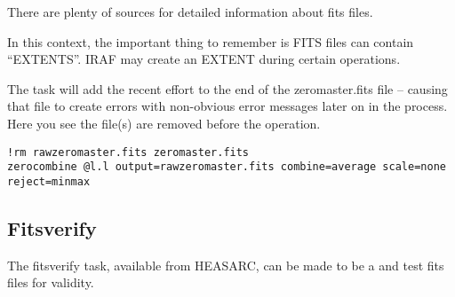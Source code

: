 There are plenty of sources for detailed information about fits files.

In this context, the important thing to remember is FITS files can contain
``EXTENTS''. IRAF may create an EXTENT during certain operations.

The task  will add the recent effort to the end of the
zeromaster.fits file -- causing that file to create errors with non-obvious
error messages later on in the process. Here you see the file(s) are
removed before the operation.

\begingroup \fontsize{10pt}{10pt}
\selectfont
\begin{verbatim} 
!rm rawzeromaster.fits zeromaster.fits
zerocombine @l.l output=rawzeromaster.fits combine=average scale=none reject=minmax
\end{verbatim}
\endgroup

\subsection{Fitsverify}

The fitsverify task, available from HEASARC, can be made to be a 
and test fits files for validity.

